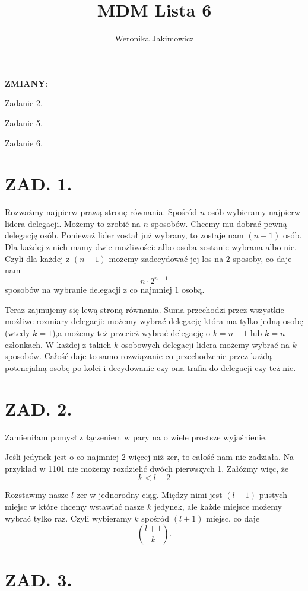 \documentclass{article}[13pt]
\author{Weronika Jakimowicz}
\title{MDM Lista 6}
\date{}
\begin{document}
\maketitle

\textbf{\large\color{def}ZMIANY}:\smallskip

\point Zadanie 2.

\point Zadanie 5.

\point Zadanie 6.


\section*{ZAD. 1.}

Rozważmy najpierw prawą stronę równania. Spośród $n$ osób wybieramy najpierw lidera delegacji. Możemy to zrobić na $n$ sposobów. Chcemy mu dobrać pewną delegację osób. Ponieważ lider został już wybrany, to zostaje nam $(n-1)$ osób. Dla każdej z nich mamy dwie możliwości: albo osoba zostanie wybrana albo nie. Czyli dla każdej z $(n-1)$ możemy zadecydować jej los na $2$ sposoby, co daje nam
$$n\cdot 2^{n-1}$$
sposobów na wybranie delegacji z co najmniej $1$ osobą.
\medskip

Teraz zajmujemy się lewą stroną równania. Suma przechodzi przez wszystkie możliwe rozmiary delegacji: możemy wybrać delegację która ma tylko jedną osobę (wtedy $k=1$),a możemy też przecież wybrać delegację o $k=n-1$ lub $k=n$ członkach. W każdej z takich $k$-osobowych delegacji lidera możemy wybrać na $k$ sposobów. Całość daje to samo rozwiązanie co przechodzenie przez każdą potencjalną osobę po kolei i decydowanie czy ona trafia do delegacji czy też nie.

\section*{ZAD. 2.}

{\color{def}Zamieniłam pomysł z łączeniem w pary na o wiele prostsze wyjaśnienie.}
\medskip

Jeśli jedynek jest o co najmniej 2 więcej niż zer, to całość nam nie zadziała. Na przykład w 1101 nie możemy rozdzielić dwóch pierwszych 1. Załóżmy więc, że
$$k<l+2$$

Rozstawmy nasze $l$ zer w jednorodny ciąg. Między nimi jest $(l+1)$ pustych miejsc w które chcemy wstawiać nasze $k$ jedynek, ale każde miejsce możemy wybrać tylko raz. Czyli wybieramy $k$ spośród $(l+1)$ miejsc, co daje
$${l+1\choose k}.$$

\section*{ZAD. 3.}
\end{document}

